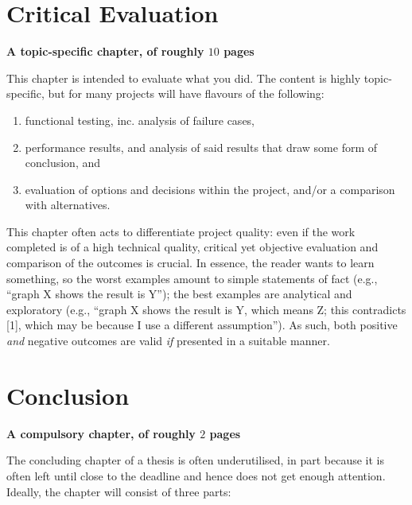 \documentclass[ %
                    author={Luke Murray},
                supervisor={Dr. Simon Hollis},
                     title={Shadow Peer-to-Peer Networks},
                  subtitle={},
                    degree={MEng},
                      year={2013} ]{thesis}
\begin{document}

\chapter{Critical Evaluation}
\label{chap:evaluation}

{\bf A topic-specific chapter, of roughly $10$ pages} 
\vspace{1cm} 

\noindent
This chapter is intended to evaluate what you did.  The content is highly 
topic-specific, but for many projects will have flavours of the following:

\begin{enumerate}
\item functional testing, inc. analysis of failure cases,
\item performance results, and analysis of said results that draw some 
      form of conclusion,
      and
\item evaluation of options and decisions within the project, and/or a
      comparison with alternatives.
\end{enumerate}

\noindent
This chapter often acts to differentiate project quality: even if the work
completed is of a high technical quality, critical yet objective evaluation 
and comparison of the outcomes is crucial.  In essence, the reader wants to
learn something, so the worst examples amount to simple statements of fact 
(e.g., ``graph X shows the result is Y''); the best examples are analytical 
and exploratory (e.g., ``graph X shows the result is Y, which means Z; this 
contradicts [1], which may be because I use a different assumption'').  As 
such, both positive {\em and} negative outcomes are valid {\em if} presented 
in a suitable manner.


\chapter{Conclusion}
\label{chap:conclusion}

{\bf A compulsory chapter, of roughly $2$ pages} 
\vspace{1cm} 

\noindent
The concluding chapter of a thesis is often underutilised, in part because
it is often left until close to the deadline and hence does not get enough 
attention.  Ideally, the chapter will consist of three parts:
\end{document}
